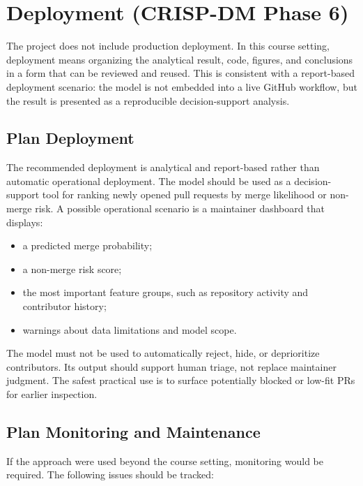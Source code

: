 \clearpage
\section{Deployment (CRISP-DM Phase 6)}

The project does not include production deployment. In this course setting, deployment means organizing the
analytical result, code, figures, and conclusions in a form that can be reviewed and reused. This is
consistent with a report-based deployment scenario: the model is not embedded into a live GitHub workflow,
but the result is presented as a reproducible decision-support analysis.

\subsection{Plan Deployment}

The recommended deployment is analytical and report-based rather than automatic operational deployment. The
model should be used as a decision-support tool for ranking newly opened pull requests by merge likelihood or
non-merge risk. A possible operational scenario is a maintainer dashboard that displays:

\begin{itemize}
    \item a predicted merge probability;
    \item a non-merge risk score;
    \item the most important feature groups, such as repository activity and contributor history;
    \item warnings about data limitations and model scope.
\end{itemize}

The model must not be used to automatically reject, hide, or deprioritize contributors. Its output should
support human triage, not replace maintainer judgment. The safest practical use is to surface potentially
blocked or low-fit PRs for earlier inspection.

\subsection{Plan Monitoring and Maintenance}

If the approach were used beyond the course setting, monitoring would be required. The following issues
should be tracked:


